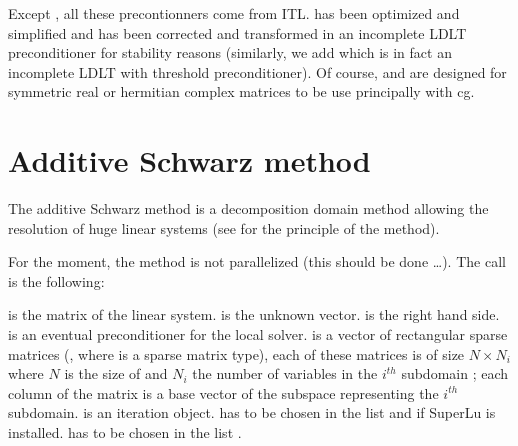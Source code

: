 \documentclass[a4paper,11pt,english]{sphinxmanual}
\begin{document}
Except , all these precontionners come from ITL.  has been optimized and simplified and  has been corrected and transformed in an incomplete LDLT preconditioner for stability reasons (similarly, we add  which is in fact an incomplete LDLT with threshold preconditioner). Of course,  and  are designed for symmetric real or hermitian complex matrices to be use principally with cg.


\section{Additive Schwarz method}
\label{\detokenize{gmm/iter:additive-schwarz-method}}
The additive Schwarz method is a decomposition domain method allowing the resolution of huge linear systems (see  for the principle of the method).

For the moment, the method is not parallelized (this should be done …). The call is the following:

\begin{sphinxVerbatim}[commandchars=\\\{\}]
       
\end{sphinxVerbatim}

 is the matrix of the linear system.  is the unknown vector.  is the right hand side.  is an eventual preconditioner for the local solver.  is a vector of rectangular sparse matrices (, where  is a sparse matrix type), each of these matrices is of size \(N \times N_i\) where \(N\) is the size of  and \(N_i\) the number of variables in the \(i^{th}\) sub\sphinxhyphen{}domain ; each column of the matrix is a base vector of the sub\sphinxhyphen{}space representing the \(i^{th}\) sub\sphinxhyphen{}domain.  is an iteration object.  has to be chosen in the list  and   if SuperLu is installed.  has to be chosen in the list .
\end{document}
